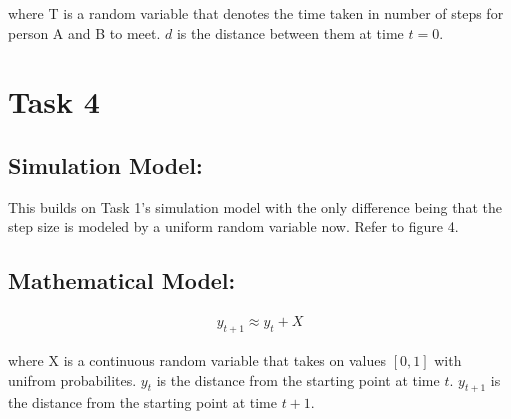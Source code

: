 \documentclass[8pt]{extarticle}
\begin{document}
where T is a random variable that denotes the time taken in number of steps for person A and B to meet.
$d$ is the distance between them at time $t = 0$.


\section*{Task 4}
\subsection*{Simulation Model:}
This builds on Task 1's simulation model with the only difference being that the step size is modeled by a uniform random variable now.
Refer to figure 4.

\subsection*{Mathematical Model:}
\begin{align*}
    y_{t+1} \approx y_{t} + X
\end{align*}

where X is a continuous random variable that takes on values $[0, 1]$ with unifrom probabilites.
$y_t$ is the distance from the starting point at time $t$. $y_{t+1}$ is the distance from the starting point at time $t+1$.
\end{document}
